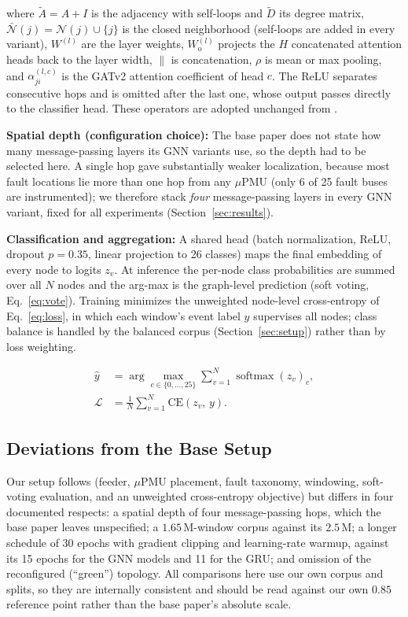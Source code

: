 \documentclass[3p,times,procedia]{elsarticle}
\begin{document}
where $\tilde A = A+I$ is the adjacency with self-loops and $\tilde D$ its degree matrix, $\bar{\mathcal N}(j)=\mathcal N(j)\cup\{j\}$ is the closed neighborhood (self-loops are added in every variant), $W^{(l)}$ are the layer weights, $W^{(l)}_{\mathrm o}$ projects the $H$ concatenated attention heads back to the layer width, $\|$ is concatenation, $\rho$ is mean or max pooling, and $\alpha^{(l,c)}_{ji}$ is the GATv2 attention coefficient of head $c$. The ReLU separates consecutive hops and is omitted after the last one, whose output passes directly to the classifier head. These operators are adopted unchanged from \cite{Karabulut2026}.

\textbf{Spatial depth (configuration choice):} The base paper does not state how many message-passing layers its GNN variants use, so the depth had to be selected here. A single hop gave substantially weaker localization, because most fault locations lie more than one hop from any $\mu$PMU (only 6 of 25 fault buses are instrumented); we therefore stack \emph{four} message-passing layers in every GNN variant, fixed for all experiments (Section~\ref{sec:results}).

\textbf{Classification and aggregation:} A shared head (batch normalization, ReLU, dropout $p=0.35$, linear projection to 26 classes) maps the final embedding of every node to logits $z_v$. At inference the per-node class probabilities are summed over all $N$ nodes and the arg-max is the graph-level prediction (soft voting, Eq.~\eqref{eq:vote}). Training minimizes the unweighted node-level cross-entropy of Eq.~\eqref{eq:loss}, in which each window's event label $y$ supervises all nodes; class balance is handled by the balanced corpus (Section~\ref{sec:setup}) rather than by loss weighting.

\begin{align}
\label{eq:vote}
\hat y &= \arg\max_{c\in\{0,\dots,25\}}
\sum_{v=1}^{N} \operatorname{softmax}(z_v)_c , \\
\label{eq:loss}
\mathcal L &= \frac{1}{N}\sum_{v=1}^{N} \mathrm{CE}\!\left(z_v,\, y\right).
\end{align}

\subsection{Deviations from the Base Setup}
\label{sec:repro}

Our setup follows \cite{Karabulut2026} (feeder, $\mu$PMU placement, fault taxonomy, windowing, soft-voting evaluation, and an unweighted cross-entropy objective) but differs in four documented respects: a spatial depth of four message-passing hops, which the base paper leaves unspecified; a $1.65$\,M-window corpus against its $2.5$\,M; a longer schedule of 30 epochs with gradient clipping and learning-rate warmup, against its 15 epochs for the GNN models and 11 for the GRU; and omission of the reconfigured (``green'') topology. All comparisons here use our own corpus and splits, so they are internally consistent and should be read against our own $0.85$ reference point rather than the base paper's absolute scale.
\end{document}
